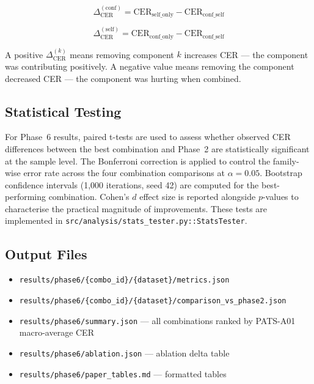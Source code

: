 \begin{equation}\label{eq:ablation_conf}
  \Delta_{\text{CER}}^{(\text{conf})} = \text{CER}_{\text{self\_only}}
    - \text{CER}_{\text{conf\_self}}
\end{equation}

\begin{equation}\label{eq:ablation_self}
  \Delta_{\text{CER}}^{(\text{self})} = \text{CER}_{\text{conf\_only}}
    - \text{CER}_{\text{conf\_self}}
\end{equation}

A positive $\Delta_{\text{CER}}^{(k)}$ means removing component $k$ increases
CER --- the component was contributing positively. A negative value means
removing the component decreased CER --- the component was hurting when
combined.

\subsection{Statistical Testing}
\label{subsec:phase6_stats}

For Phase~6 results, paired t-tests are used to assess whether observed CER
differences between the best combination and Phase~2 are statistically
significant at the sample level. The Bonferroni correction is applied to
control the family-wise error rate across the four combination comparisons
at $\alpha = 0.05$. Bootstrap confidence intervals (1,000 iterations, seed 42)
are computed for the best-performing combination. Cohen's $d$ effect size is
reported alongside $p$-values to characterise the practical magnitude of
improvements. These tests are implemented in
\texttt{src/analysis/stats\_tester.py::StatsTester}.

\subsection{Output Files}
\begin{itemize}
  \item \texttt{results/phase6/\{combo\_id\}/\{dataset\}/metrics.json}
  \item \texttt{results/phase6/\{combo\_id\}/\{dataset\}/comparison\_vs\_phase2.json}
  \item \texttt{results/phase6/summary.json} --- all combinations ranked by
        PATS-A01 macro-average CER
  \item \texttt{results/phase6/ablation.json} --- ablation delta table
  \item \texttt{results/phase6/paper\_tables.md} --- formatted tables
\end{itemize}


